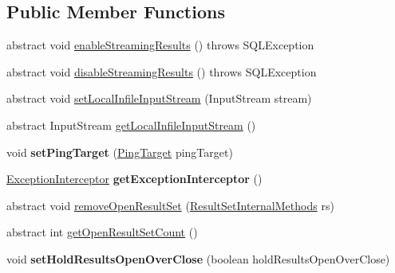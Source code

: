 \subsection*{Public Member Functions}
\begin{DoxyCompactItemize}
\item 
abstract void \mbox{\hyperlink{interfacecom_1_1mysql_1_1jdbc_1_1_statement_aa90a0a4175d666982052d7bccacc272e}{enable\+Streaming\+Results}} ()  throws S\+Q\+L\+Exception
\item 
abstract void \mbox{\hyperlink{interfacecom_1_1mysql_1_1jdbc_1_1_statement_a68a7ee39de3b6cc9743674b40c5d9f73}{disable\+Streaming\+Results}} ()  throws S\+Q\+L\+Exception
\item 
abstract void \mbox{\hyperlink{interfacecom_1_1mysql_1_1jdbc_1_1_statement_ac5064854dd97b64cb4e94fa5492ce65e}{set\+Local\+Infile\+Input\+Stream}} (Input\+Stream stream)
\item 
abstract Input\+Stream \mbox{\hyperlink{interfacecom_1_1mysql_1_1jdbc_1_1_statement_a8d6f52df95db141768cab717ef315038}{get\+Local\+Infile\+Input\+Stream}} ()
\item 
\mbox{\label{interfacecom_1_1mysql_1_1jdbc_1_1_statement_afba277af83825bf0ffabb049bd165d41}} 
void {\bfseries set\+Ping\+Target} (\mbox{\hyperlink{interfacecom_1_1mysql_1_1jdbc_1_1_ping_target}{Ping\+Target}} ping\+Target)
\item 
\mbox{\label{interfacecom_1_1mysql_1_1jdbc_1_1_statement_a4e7b778ea8185f5c041c7f33424cf932}} 
\mbox{\hyperlink{interfacecom_1_1mysql_1_1jdbc_1_1_exception_interceptor}{Exception\+Interceptor}} {\bfseries get\+Exception\+Interceptor} ()
\item 
abstract void \mbox{\hyperlink{interfacecom_1_1mysql_1_1jdbc_1_1_statement_ac157ef68090c01cd48019a20205e367a}{remove\+Open\+Result\+Set}} (\mbox{\hyperlink{interfacecom_1_1mysql_1_1jdbc_1_1_result_set_internal_methods}{Result\+Set\+Internal\+Methods}} rs)
\item 
abstract int \mbox{\hyperlink{interfacecom_1_1mysql_1_1jdbc_1_1_statement_ac05ee0ee7cf1de370e7206762dc40d21}{get\+Open\+Result\+Set\+Count}} ()
\item 
\mbox{\label{interfacecom_1_1mysql_1_1jdbc_1_1_statement_a1809ca09fcb7faa1e9a5323713ddf841}} 
void {\bfseries set\+Hold\+Results\+Open\+Over\+Close} (boolean hold\+Results\+Open\+Over\+Close)
\end{DoxyCompactItemize}


